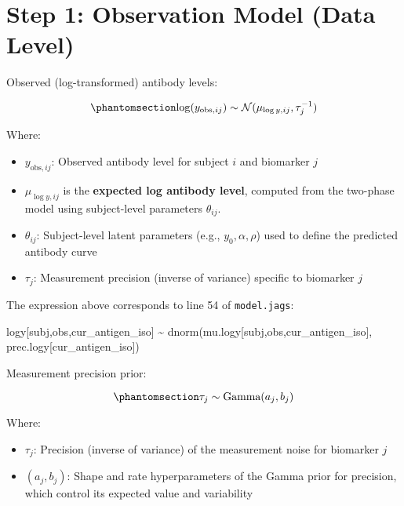 \documentclass[
]{article}
\newenvironment{Shaded}{\begin{snugshade}}{\end{snugshade}}
\newcommand{\FunctionTok}[1]{\textcolor[rgb]{0.28,0.35,0.67}{#1}}
\newcommand{\NormalTok}[1]{\textcolor[rgb]{0.00,0.23,0.31}{#1}}
\newcommand{\SpecialCharTok}[1]{\textcolor[rgb]{0.37,0.37,0.37}{#1}}
\providecommand{\tightlist}{%
  \setlength{\itemsep}{0pt}\setlength{\parskip}{0pt}}\usepackage{longtable,booktabs,array}
\begin{document}
\section{Step 1: Observation Model (Data
Level)}\label{step-1-observation-model-data-level}

Observed (log-transformed) antibody levels:

\begin{equation}\phantomsection\label{eq-1}{
\log(y_{\text{obs},ij}) \sim \mathcal{N}(\mu_{\log y,ij}, \tau_j^{-1})
}\end{equation}

Where:

\begin{itemize}
\tightlist
\item
  \(y_{\text{obs},ij}\): Observed antibody level for subject \(i\) and
  biomarker \(j\)
\item
  \(\mu_{\log y,ij}\) is the \textbf{expected log antibody level},
  computed from the two-phase model using subject-level parameters
  \(\theta_{ij}\).
\item
  \(\theta_{ij}\): Subject-level latent parameters (e.g.,
  \(y_0, \alpha, \rho\)) used to define the predicted antibody curve
\item
  \(\tau_j\): Measurement precision (inverse of variance) specific to
  biomarker \(j\)
\end{itemize}

The expression above corresponds to line 54 of \texttt{model.jags}:

\begin{Shaded}
\begin{Highlighting}[numbers=left,,firstnumber=54,]
\NormalTok{     logy[subj,obs,cur\_antigen\_iso] }\SpecialCharTok{\textasciitilde{}} \FunctionTok{dnorm}\NormalTok{(mu.logy[subj,obs,cur\_antigen\_iso], prec.logy[cur\_antigen\_iso])}
\end{Highlighting}
\end{Shaded}

Measurement precision prior:

\begin{equation}\phantomsection\label{eq-2}{
\tau_j \sim \text{Gamma}(a_j, b_j)
}\end{equation}

Where:

\begin{itemize}
\tightlist
\item
  \(\tau_j\): Precision (inverse of variance) of the measurement noise
  for biomarker \(j\)
\item
  \((a_j, b_j)\): Shape and rate hyperparameters of the Gamma prior for
  precision, which control its expected value and variability
\end{itemize}
\end{document}
